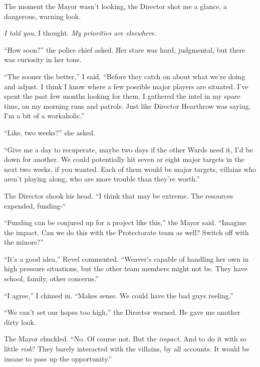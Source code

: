 The moment the Mayor wasn't looking, the Director shot me a glance, a dangerous, warning look.



\emph{I told you}, I thought.  \emph{My priorities are elsewhere}.



``How soon?'' the police chief asked.  Her stare was hard, judgmental, but there was curiosity in her tone.



``The sooner the better,'' I said.  ``Before they catch on about what we're doing and adjust.  I think I know where a few possible major players are situated.  I've spent the past few months looking for them.  I gathered the intel in my spare time, on my morning runs and patrols.  Just like Director Hearthrow was saying.  I'm a bit of a workaholic.''



``Like, two weeks?'' she asked.



``Give me a day to recuperate, maybe two days if the other Wards need it, I'd be down for another.  We could potentially hit seven or eight major targets in the next two weeks, if you wanted.  Each of them would be major targets, villains who aren't playing along, who are more trouble than they're worth.''



The Director shook his head.  ``I think that may be extreme.  The resources expended, funding-``



``Funding can be conjured up for a project like this,'' the Mayor said.  ``Imagine the impact.  Can we do this with the Protectorate team as well?  Switch off with the minors?''



``It's a good idea,'' Revel commented.  ``Weaver's capable of handling her own in high pressure situations, but the other team members might not be.  They have school, family, other concerns.''



``I agree,'' I chimed in.  ``Makes sense.  We could have the bad guys reeling.''



``We can't set our hopes too high,'' the Director warned.  He gave me another dirty look.



The Mayor chuckled.  ``No.  Of course not.  But the \emph{impact}.  And to do it with so little \emph{risk}?  They barely interacted with the villains, by all accounts.  It would be insane to pass up the opportunity.''



